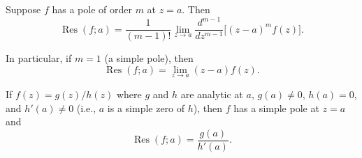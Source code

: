 Suppose $f$ has a pole of order $m$ at $z = a$. Then
$$\operatorname{Res}(f; a) = \frac{1}{(m-1)!} \lim_{z \to a} \frac{d^{m-1}}{dz^{m-1}} \bigl[(z-a)^m f(z)\bigr].$$

In particular, if $m = 1$ (a simple pole), then
$$\operatorname{Res}(f; a) = \lim_{z \to a} (z-a) f(z).$$

If $f(z) = g(z)/h(z)$ where $g$ and $h$ are analytic at $a$, $g(a) \neq 0$, $h(a) = 0$, and $h'(a) \neq 0$ (i.e., $a$ is a simple zero of $h$), then $f$ has a simple pole at $z = a$ and
$$\operatorname{Res}(f; a) = \frac{g(a)}{h'(a)}.$$
